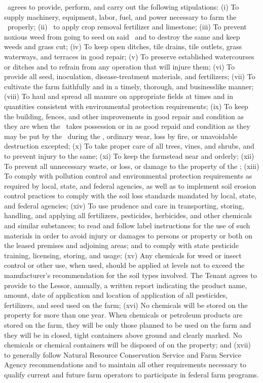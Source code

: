 \lessor\ agrees to provide, perform, and carry out the following stipulations: (i) To supply machinery, equipment, labor, fuel, and power necessary to farm the \property\ properly; (ii) \lessee\ to apply crop removal fertilizer and limestone; (iii) To prevent noxious weed from going to seed on said \property\ and to destroy the same and keep weeds and grass cut; (iv) To keep open ditches, tile drains, tile outlets, grass waterways, and terraces in good repair; (v) To preserve established watercourses or ditches and to refrain from any operation that will injure them; (vi) To provide all seed, inoculation, disease-treatment materials, and fertilizers; (vii) To cultivate the farm faithfully and in a timely, thorough, and businesslike manner; (viii) To haul and spread all manure on appropriate fields at times and in quantities consistent with environmental protection requirements; (ix) To keep the building, fences, and other improvements in good repair and condition as they are when the \lessee\ takes possession or in as good repaid and condition as they may be put by the \lessor\ during the \termoflease, ordinary wear, loss by fire, or unavoidable destruction excepted; (x) To take proper care of all trees, vines, and shrubs, and to prevent injury to the same; (xi) To keep the farmstead near and orderly; (xii) To prevent all unnecessary waste, or loss, or damage to the property of the \lessor; (xiii) To comply with pollution control and environmental protection requirements as required by local, state, and federal agencies, as well as to implement soil erosion control practices to comply with the soil loss standards mandated by local, state, and federal agencies; (xiv) To use prudence and care in transporting, storing, handling, and applying all fertilizers, pesticides, herbicides, and other chemicals and similar substances; to read and follow label instructions for the use of such materials in order to avoid injury or damages to persons or property or both on the leased premises and adjoining areas; and to comply with state pesticide training, licensing, storing, and usage; (xv) Any chemicals for weed or insect control or other use, when used, should be applied at levels not to exceed the manufacturer’s recommendation for the soil types involved. The Tenant agrees to provide to the Lessor, annually, a written report indicating the product name, amount, date of application and location of application of all pesticides, fertilizers, and seed used on the farm; (xvi) No chemicals will be stored on the property for more than one year. When chemicals or petroleum products are stored on the farm, they will be only those planned to be used on the farm and they will be in closed, tight containers above ground and clearly marked. No chemicals or chemical containers will be disposed of on the property; and (xvii) to generally follow Natural Resource Conservation Service and Farm Service Agency recommendations and to maintain all other requirements necessary to qualify current and future farm operators to participate in federal farm programs.
